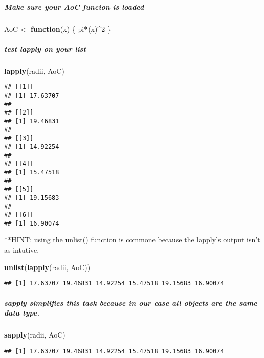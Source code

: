 \documentclass[]{article}
\newenvironment{Shaded}{\begin{snugshade}}{\end{snugshade}}
\newcommand{\KeywordTok}[1]{\textcolor[rgb]{0.13,0.29,0.53}{\textbf{#1}}}
\newcommand{\DecValTok}[1]{\textcolor[rgb]{0.00,0.00,0.81}{#1}}
\newcommand{\StringTok}[1]{\textcolor[rgb]{0.31,0.60,0.02}{#1}}
\newcommand{\ControlFlowTok}[1]{\textcolor[rgb]{0.13,0.29,0.53}{\textbf{#1}}}
\newcommand{\OperatorTok}[1]{\textcolor[rgb]{0.81,0.36,0.00}{\textbf{#1}}}
\newcommand{\NormalTok}[1]{#1}
\let\oldsubparagraph\subparagraph
\renewcommand{\subparagraph}[1]{\oldsubparagraph{#1}\mbox{}}
\begin{document}
\subparagraph{Make sure your AoC funcion is
loaded}\label{make-sure-your-aoc-funcion-is-loaded}

\begin{Shaded}
\begin{Highlighting}[]
\NormalTok{AoC <-}\StringTok{ }\ControlFlowTok{function}\NormalTok{(x) \{}
\NormalTok{  pi}\OperatorTok{*}\NormalTok{(x)}\OperatorTok{^}\DecValTok{2}
\NormalTok{\}}
\end{Highlighting}
\end{Shaded}

\subparagraph{test lapply on your list}\label{test-lapply-on-your-list}

\begin{Shaded}
\begin{Highlighting}[]
\KeywordTok{lapply}\NormalTok{(radii, AoC)}
\end{Highlighting}
\end{Shaded}

\begin{verbatim}
## [[1]]
## [1] 17.63707
## 
## [[2]]
## [1] 19.46831
## 
## [[3]]
## [1] 14.92254
## 
## [[4]]
## [1] 15.47518
## 
## [[5]]
## [1] 19.15683
## 
## [[6]]
## [1] 16.90074
\end{verbatim}

**HINT: using the unlist() function is commone because the lapply's
output isn't as intutive.

\begin{Shaded}
\begin{Highlighting}[]
\KeywordTok{unlist}\NormalTok{(}\KeywordTok{lapply}\NormalTok{(radii, AoC))}
\end{Highlighting}
\end{Shaded}

\begin{verbatim}
## [1] 17.63707 19.46831 14.92254 15.47518 19.15683 16.90074
\end{verbatim}

\subparagraph{sapply simplifies this task because in our case all
objects are the same data
type.}\label{sapply-simplifies-this-task-because-in-our-case-all-objects-are-the-same-data-type.}

\begin{Shaded}
\begin{Highlighting}[]
\KeywordTok{sapply}\NormalTok{(radii, AoC)}
\end{Highlighting}
\end{Shaded}

\begin{verbatim}
## [1] 17.63707 19.46831 14.92254 15.47518 19.15683 16.90074
\end{verbatim}
\end{document}
